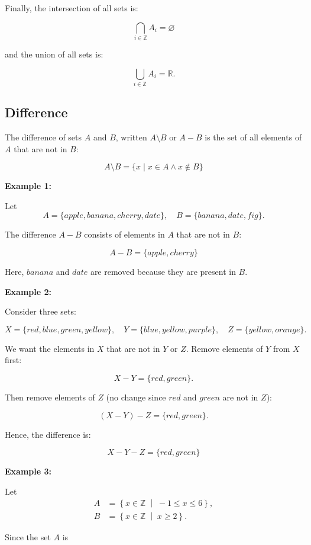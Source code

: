 \documentclass[12pt,a4paper,openany]{article}
\begin{document}
Finally, the intersection of all sets is:

$$
\displaystyle\bigcap_{i \in \mathbb{Z}} A_i = \varnothing
$$

and the union of all sets is:

$$
\displaystyle\bigcup_{i \in \mathbb{Z}} A_i = \mathbb{R}.
$$

\subsection{Difference}\label{Difference}

The difference of sets $A$ and $B$, written $A \setminus B$ or $A - B$ is the set of all elements of $A$ that are not in $B$:

$$
A \setminus B = \{x \mid x \in A \land x \notin B\}
$$

\textbf{Example 1:}

Let  
\[
A = \{apple, banana, cherry, date\}, \quad B = \{banana, date, fig\}.
\]

The difference $A - B$ consists of elements in $A$ that are not in $B$:

\[
\boxed{A - B = \{apple, cherry\}}
\]

Here, $banana$ and $date$ are removed because they are present in $B$.

\textbf{Example 2:}

Consider three sets:

\[
X = \{red, blue, green, yellow\}, \quad
Y = \{blue, yellow, purple\}, \quad
Z = \{yellow, orange\}.
\]

We want the elements in $X$ that are not in $Y$ or $Z$. Remove elements of $Y$ from $X$ first:

\[
X - Y = \{red, green\}.
\]

Then remove elements of $Z$ (no change since $red$ and $green$ are not in $Z$):

\[
(X - Y) - Z = \{red, green\}.
\]

Hence, the difference is:

\[
\boxed{X - Y - Z = \{red, green\}}
\]

\textbf{Example 3:}

Let  
\[
\begin{aligned}
A &= \left\{ x \in \mathbb{Z} \;\middle|\; -1 \le x \le 6 \right\}, \\
B &= \left\{ x \in \mathbb{Z} \;\middle|\; x \ge 2 \right\}.
\end{aligned}
\]

Since the set $A$ is
\end{document}
